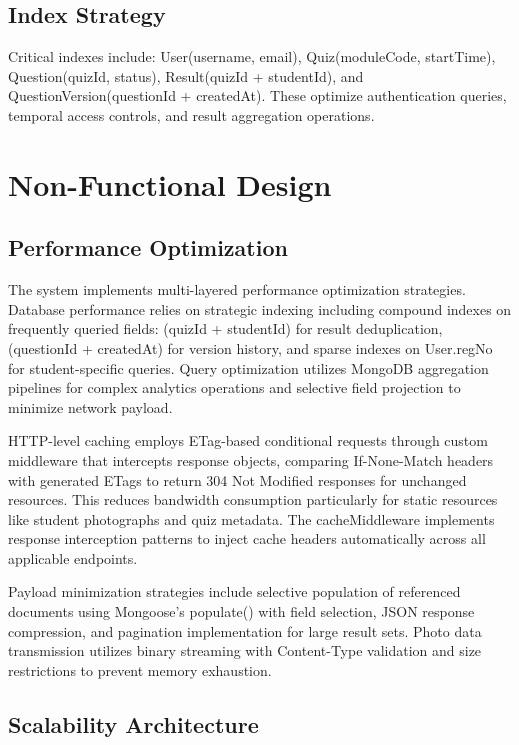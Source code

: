 \subsection{Index Strategy}

Critical indexes include: User(username, email), Quiz(moduleCode, startTime), Question(quizId, status), Result(quizId + studentId), and QuestionVersion(questionId + createdAt). These optimize authentication queries, temporal access controls, and result aggregation operations.

\section{Non-Functional Design}

\subsection{Performance Optimization}

The system implements multi-layered performance optimization strategies. Database performance relies on strategic indexing including compound indexes on frequently queried fields: (quizId + studentId) for result deduplication, (questionId + createdAt) for version history, and sparse indexes on User.regNo for student-specific queries. Query optimization utilizes MongoDB aggregation pipelines for complex analytics operations and selective field projection to minimize network payload.

HTTP-level caching employs ETag-based conditional requests through custom middleware that intercepts response objects, comparing If-None-Match headers with generated ETags to return 304 Not Modified responses for unchanged resources. This reduces bandwidth consumption particularly for static resources like student photographs and quiz metadata. The cacheMiddleware implements response interception patterns to inject cache headers automatically across all applicable endpoints.

Payload minimization strategies include selective population of referenced documents using Mongoose's populate() with field selection, JSON response compression, and pagination implementation for large result sets. Photo data transmission utilizes binary streaming with Content-Type validation and size restrictions to prevent memory exhaustion.

\subsection{Scalability Architecture}

